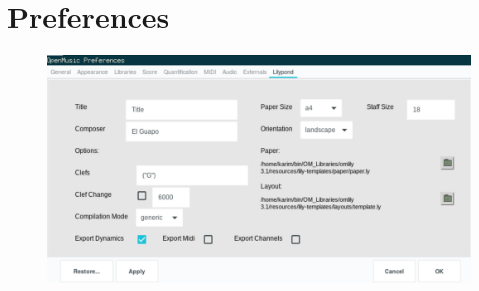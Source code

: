 \documentclass{article}
\begin{document}
\section{Preferences}

\begin{figure}[H]
    \centering
    \includegraphics[scale=0.7]{fig/panel}
  \end{figure}
  
\end{document}
